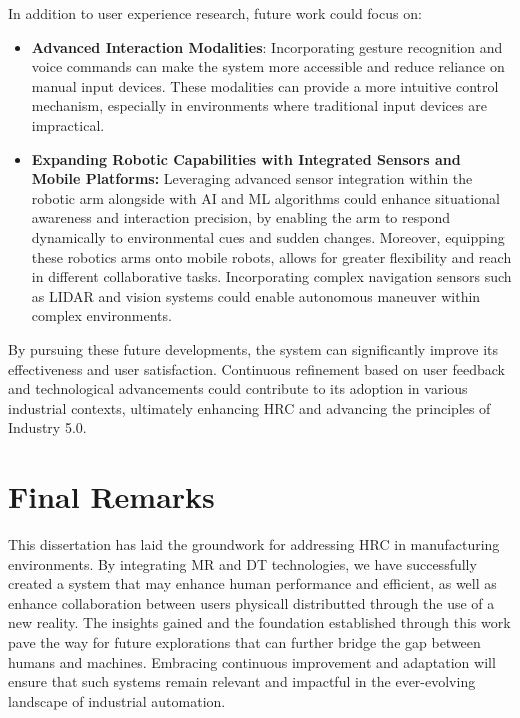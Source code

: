 In addition to user experience research, future work could focus on:

\begin{itemize} 

    \item \textbf{Advanced Interaction Modalities}: Incorporating gesture recognition and voice commands can make the system more accessible and reduce reliance on manual input devices. These modalities can provide a more intuitive control mechanism, especially in environments where traditional input devices are impractical.
    
    \item \textbf{Expanding Robotic Capabilities with Integrated Sensors and Mobile Platforms:} Leveraging advanced sensor integration within the robotic arm alongside with \ac{AI} and \ac{ML} algorithms could enhance situational awareness and interaction precision, by enabling the arm to respond dynamically to environmental cues and sudden changes. Moreover, equipping these robotics arms onto mobile robots, allows for greater flexibility and reach in different collaborative tasks. Incorporating complex navigation sensors such as \ac{LIDAR} and vision systems could enable autonomous maneuver within complex environments.

\end{itemize}

By pursuing these future developments, the system can significantly improve its effectiveness and user satisfaction. Continuous refinement based on user feedback and technological advancements could contribute to its adoption in various industrial contexts, ultimately enhancing \ac{HRC} and advancing the principles of Industry 5.0.

\section{Final Remarks}

This dissertation has laid the groundwork for addressing \ac{HRC} in manufacturing environments. By integrating \ac{MR} and \ac{DT} technologies, we have successfully created a system that may enhance human performance and efficient, as well as enhance collaboration between users physicall distributted through the use of a new reality. The insights gained and the foundation established through this work pave the way for future explorations that can further bridge the gap between humans and machines. Embracing continuous improvement and adaptation will ensure that such systems remain relevant and impactful in the ever-evolving landscape of industrial automation.